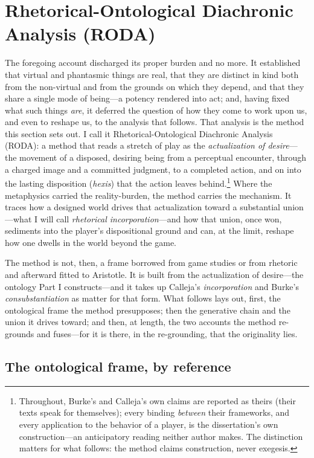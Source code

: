 \documentclass{article}
\begin{document}
\section{Rhetorical-Ontological Diachronic Analysis (RODA)}

The foregoing account discharged its proper burden and no more. It established that virtual and phantasmic things are real, that they are distinct in kind both from the non-virtual and from the grounds on which they depend, and that they share a single mode of being---a potency rendered into act; and, having fixed what such things \textit{are}, it deferred the question of how they come to work upon us, and even to reshape us, to the analysis that follows. That analysis is the method this section sets out. I call it Rhetorical-Ontological Diachronic Analysis (RODA): a method that reads a stretch of play as the \textit{actualization of desire}---the movement of a disposed, desiring being from a perceptual encounter, through a charged image and a committed judgment, to a completed action, and on into the lasting disposition (\textit{hexis}) that the action leaves behind.\footnote{Throughout, Burke's and Calleja's own claims are reported as theirs (their texts speak for themselves); every binding \textit{between} their frameworks, and every application to the behavior of a player, is the dissertation's own construction---an anticipatory reading neither author makes. The distinction matters for what follows: the method claims construction, never exegesis.} Where the metaphysics carried the reality-burden, the method carries the mechanism. It traces how a designed world drives that actualization toward a substantial union---what I will call \textit{rhetorical incorporation}---and how that union, once won, sediments into the player's dispositional ground and can, at the limit, reshape how one dwells in the world beyond the game.

The method is not, then, a frame borrowed from game studies or from rhetoric and afterward fitted to Aristotle. It is built from the actualization of desire---the ontology Part I constructs---and it takes up Calleja's \textit{incorporation} and Burke's \textit{consubstantiation} as matter for that form. What follows lays out, first, the ontological frame the method presupposes; then the generative chain and the union it drives toward; and then, at length, the two accounts the method re-grounds and fuses---for it is there, in the re-grounding, that the originality lies.

\subsection{The ontological frame, by reference}
\end{document}
